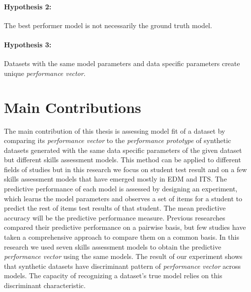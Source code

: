 \paragraph{Hypothesis 2:} The best performer model is not necessarily the ground truth model.
\paragraph{Hypothesis 3:} Datasets with the same model parameters and data specific parameters create unique \textit{performance vector}. 

\section{Main Contributions}

The main contribution of this thesis is assessing model fit of a dataset by comparing its \textit{performance vector} to the \textit{performance prototype} of synthetic datasets generated with the same data specific parameters of the given dataset but different skills assessment models. This method can be applied to different fields of studies but in this research we focus on student test result and on a few skills assessment models that have emerged mostly in EDM and ITS. The predictive performance of each model is assessed by designing an experiment, which learns the model parameters and observes a set of items for a student to predict the rest of items test results of that student. The mean predictive accuracy will be the predictive performance measure. Previous researches compared their predictive performance on a pairwise basis, but few studies have taken a comprehensive approach to compare them on a common basis. In this research we used seven skills assessment models to obtain the predictive \textit{performance vector} using the same models. The result of our experiment shows that synthetic datasets have discriminant pattern of \textit{performance vector} across models. The capacity of recognizing a dataset’s true model relies on this discriminant characteristic.

